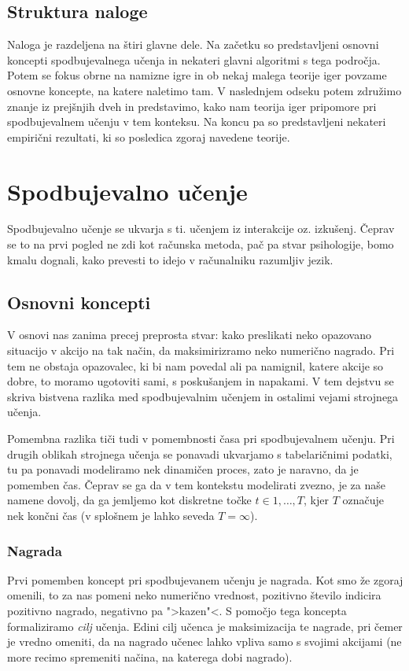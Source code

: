 \documentclass[12pt,a4paper]{amsart}
\theoremstyle{definition} %
\theoremstyle{plain} %
\begin{document}
\subsection{Struktura naloge}
Naloga je razdeljena na štiri glavne dele. Na začetku so predstavljeni osnovni koncepti 
spodbujevalnega učenja in nekateri glavni algoritmi s tega področja. Potem se fokus obrne 
na namizne igre in ob nekaj malega teorije iger povzame osnovne koncepte, na katere naletimo
tam. V naslednjem odseku potem združimo znanje iz prejšnjih dveh in predstavimo, kako nam
teorija iger pripomore pri spodbujevalnem učenju v tem konteksu. Na koncu pa so predstavljeni 
nekateri empirični rezultati, ki so posledica zgoraj navedene teorije.

\section{Spodbujevalno učenje}
Spodbujevalno učenje se ukvarja s ti. učenjem iz interakcije oz. izkušenj. Čeprav se to na prvi 
pogled ne zdi kot računska metoda, pač pa stvar psihologije, bomo kmalu dognali, kako prevesti 
to idejo v računalniku razumljiv jezik.

\subsection{Osnovni koncepti}
V osnovi nas zanima precej preprosta stvar: kako preslikati neko opazovano situacijo v akcijo na 
tak način, da maksimirizramo neko numerično nagrado. Pri tem ne obstaja opazovalec, ki bi nam 
povedal ali pa namignil, katere akcije so dobre, to moramo ugotoviti sami, s poskušanjem in 
napakami. V tem dejstvu se skriva bistvena razlika med spodbujevalnim učenjem in ostalimi vejami 
strojnega učenja.

Pomembna razlika tiči tudi v pomembnosti časa pri spodbujevalnem učenju. Pri drugih oblikah 
strojnega učenja se ponavadi ukvarjamo s tabelaričnimi podatki, tu pa ponavadi modeliramo nek 
dinamičen proces, zato je naravno, da je pomemben čas. Čeprav se ga da v tem kontekstu 
modelirati zvezno, je za naše namene dovolj, da ga jemljemo kot diskretne točke $t \in 
{1, \dots, T}$, kjer $T$ označuje nek končni čas (v splošnem je lahko seveda $T = \infty$).

\subsubsection{Nagrada}
Prvi pomemben koncept pri spodbujevanem učenju je nagrada. Kot smo že zgoraj omenili, to za nas 
pomeni neko numerično vrednost, pozitivno število indicira pozitivno nagrado, negativno pa 
">kazen"<. S pomočjo tega koncepta formaliziramo \textit{cilj} učenja. Edini cilj učenca je 
maksimizacija te nagrade, pri čemer je vredno omeniti, da na nagrado učenec lahko vpliva samo 
s svojimi akcijami (ne more recimo spremeniti načina, na katerega dobi nagrado). 
\end{document}
